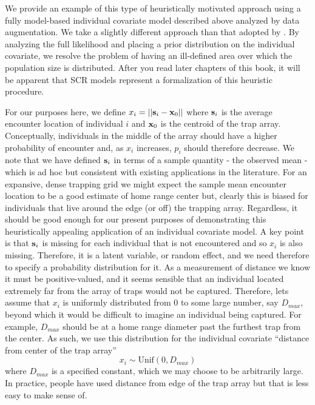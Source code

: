 We provide an example of this type of heuristically motivated
approach using a fully model-based individual covariate model
described above analyzed by data augmentation. We take a slightly
different approach than that adopted by
\citet{boulanger_mclellan:2001}. By analyzing the full likelihood and
placing a prior distribution on the individual covariate, we resolve
the problem of having an ill-defined area over which the population
size is distributed. After you read later chapters of this book, it
will be apparent that SCR models represent a formalization of this
heuristic procedure.

For our purposes here, we define $x_{i} = ||{\bf s}_{i} - {\bf
  x}_{0}||$ where ${\bf s}_{i}$ is the average encounter location of
individual $i$ and ${\bf x}_{0}$ is the centroid of the trap array.
Conceptually, individuals in the middle of the array should have a
higher probability of encounter and, as $x_{i}$ increases, $p_{i}$
should therefore decrease. We note that we have defined ${\bf s}_{i}$
in terms of a sample quantity - the observed mean - which is ad hoc
but consistent with existing applications in the literature.  For an
expansive, dense trapping grid we might expect the sample mean
encounter location to be a good estimate of home range center but,
clearly this is biased for individuals that live around the edge (or
off) the trapping array. Regardless, it should be good enough for our
present purposes of demonstrating this heuristically appealing
application of an individual covariate model. A key point is that
${\bf s}_{i}$ is missing for each individual that is not encountered
and so  $x_{i}$ is also missing. Therefore, it is a latent variable, or random
effect, and we need therefore to specify a probability distribution
for it.  As a measurement of distance we know it must be
positive-valued, and it seems sensible that an individual located
extremely far from the array of traps would not be captured.
Therefore,
 lets assume that $x_{i}$ is uniformly distributed from $0$ to some large number,
say $D_{max}$, beyond which it would be difficult to imagine an
individual being captured. For example, $D_{max}$ should be at a home
range diameter past the furthest trap from the center.  As such, we
use this distribution for the individual covariate ``distance from
center of the trap array''
\[
 x_{i} \sim \mbox{Unif}(0,D_{max})
\]
where $D_{max}$ is a specified constant, which we may choose to be
arbitrarily large.  In practice, people have
used distance from edge of the trap array but that is less easy to
make sense of.


